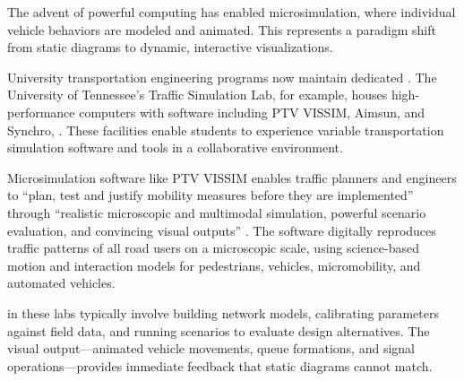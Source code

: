 The advent of powerful computing has enabled microsimulation, where individual vehicle behaviors are modeled and animated. This represents a paradigm shift from static diagrams to dynamic, interactive visualizations.

University transportation engineering programs now maintain dedicated . The University of Tennessee's Traffic Simulation Lab, for example, houses high-performance computers with software including PTV VISSIM, Aimsun, and Synchro,  . These facilities enable students to experience variable transportation simulation software and tools in a collaborative environment.

Microsimulation software like PTV VISSIM enables traffic planners and engineers to ``plan, test and justify mobility measures before they are implemented'' through ``realistic microscopic and multimodal simulation, powerful scenario evaluation, and convincing visual outputs'' . The software digitally reproduces traffic patterns of all road users on a microscopic scale, using science-based motion and interaction models for pedestrians, vehicles, micromobility, and automated vehicles.

 in these labs typically involve building network models, calibrating parameters against field data, and running scenarios to evaluate design alternatives. The visual output---animated vehicle movements, queue formations, and signal operations---provides immediate feedback that static diagrams cannot match.


